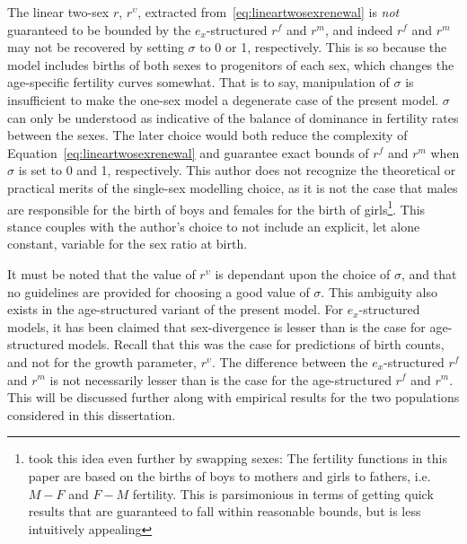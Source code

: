 The linear two-sex $r$, $r^\upsilon$, extracted from~\eqref{eq:lineartwosexrenewal} 
is \textit{not} guaranteed to be bounded by the $e_x$-structured $r^f$ and $r^m$,
and indeed $r^f$ and $r^m$ may not be recovered by setting $\sigma$ to 0 or 1,
respectively. This is so because the model includes births of both sexes to
progenitors of each sex, which changes the age-specific fertility curves
somewhat. That is to say, manipulation of $\sigma$ is insufficient to make the
one-sex model a degenerate case of the present model. $\sigma$ can only be
understood as indicative of the balance of dominance in fertility rates between
the sexes. The later choice would both reduce the complexity of
Equation~\ref{eq:lineartwosexrenewal} and guarantee exact bounds of $r^f$ and $r^m$ 
when $\sigma$ is set to 0 and 1, respectively. This author does not recognize 
the theoretical or practical merits of the single-sex modelling choice, as it 
is not the case that males are responsible for the birth of boys and females 
for the birth of girls\footnote{\citet{pollard1948measurement} took this idea
even further by swapping sexes: The fertility functions in this paper are based on the births of boys to mothers and girls to fathers, i.e. $M-F$ and $F-M$ fertility. This is parsimonious 
in terms of getting quick results that are guaranteed to fall within reasonable bounds, but is less
intuitively appealing}. This stance couples with the author's choice to not
include an explicit, let alone constant, variable for the sex ratio at birth.

It must be
noted that the value of $r^\upsilon$ is dependant upon the choice of $\sigma$, 
and that no guidelines are provided for choosing a good value of $\sigma$. 
This ambiguity also exists in the age-structured variant of the present model. 
For $e_x$-structured models, it has been claimed that sex-divergence is lesser than is the case for
age-structured models. Recall that this was the case for predictions of birth
counts, and not for the growth parameter, $r^\upsilon$. The
difference between the $e_x$-structured $r^f$ and $r^m$ is not necessarily lesser than is the case for
the age-structured $r^f$ and $r^m$. This will be discussed further along with
empirical results for the two populations considered in this dissertation.
